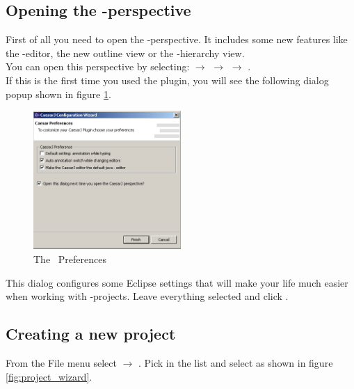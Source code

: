 \subsection{Opening the \caesarj -perspective}
First of all you need to open the \caesarj -perspective. It includes some new features like the \caesar -editor, the new outline view or the \caesarj -hierarchy view.\\
You can open this perspective by selecting:  $\rightarrow$  $\rightarrow$  $\rightarrow$ .\\
If this is the first time you used the plugin, you will see the following dialog popup shown in figure \ref{fig:view_properties}.

\begin{figure}[htbp]
	\centering
		\includegraphics[width=0.5\textwidth]{images/view_properties.png}
	\caption{The \caesarj ~Preferences}	
	\label{fig:view_properties}
\end{figure}

This dialog configures some Eclipse settings that will make your life much easier when
working with \caesarj -projects. Leave everything selected and click
.

\subsection{Creating a new \caesarj project \label{creating_project}}
From the File menu select  $\rightarrow$ . Pick  in the list and select  as shown in figure \ref{fig:project_wizard}.

